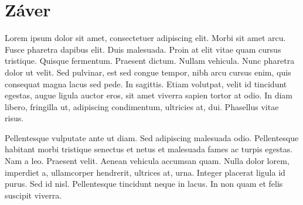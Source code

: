 \newpage
\chapter{Záver}

Lorem ipsum dolor sit amet, consectetuer adipiscing elit. Morbi sit amet arcu. Fusce pharetra dapibus elit. Duis malesuada. Proin at elit vitae quam cursus tristique. Quisque fermentum. Praesent dictum. Nullam vehicula. Nunc pharetra dolor ut velit. Sed pulvinar, est sed congue tempor, nibh arcu cursus enim, quis consequat magna lacus sed pede. In sagittis. Etiam volutpat, velit id tincidunt egestas, augue ligula auctor eros, sit amet viverra sapien tortor at odio. In diam libero, fringilla ut, adipiscing condimentum, ultricies at, dui. Phasellus vitae risus.

Pellentesque vulputate ante ut diam. Sed adipiscing malesuada odio. Pellentesque habitant morbi tristique senectus et netus et malesuada fames ac turpis egestas. Nam a leo. Praesent velit. Aenean vehicula accumsan quam. Nulla dolor lorem, imperdiet a, ullamcorper hendrerit, ultrices at, urna. Integer placerat ligula id purus. Sed id nisl. Pellentesque tincidunt neque in lacus. In non quam et felis suscipit viverra.